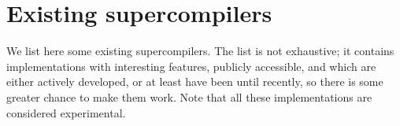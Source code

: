\section{Existing supercompilers}
\label{sec:supercompilers}


We list here some existing supercompilers.
The list is not exhaustive; it contains implementations with interesting features,
publicly accessible,
and which are either actively developed, or at least have been until recently,
so there is some greater chance to make them work.
Note that all these implementations are considered experimental.

